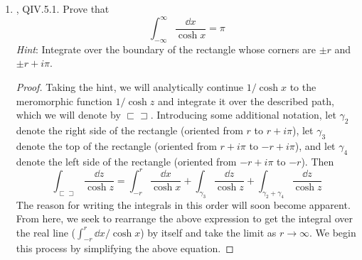 \documentclass[../psets.tex]{subfiles}
\begin{document}
\begin{enumerate}[ref={A.\arabic*}]
\begin{enumerate}
\begin{proof}
            \begin{align*}
                \res_{\bar{z}}f &= \frac{1}{2\pi i}\int_{g(\partial D)}f(w)\dd{w}\\
                &= \frac{1}{2\pi i}\int_{\partial D}f(g(\zeta))\dd{w}\\
                &= \frac{1}{2\pi i}\int_{\partial D}f(\bar{\zeta})\dd\bar{\zeta}\\
                &= \frac{1}{2\pi i}\int_{\partial D}\overline{f(\zeta)\dd\zeta}\\
                &= \frac{1}{2\pi i}\overline{\int_{\partial D}f(\zeta)\dd\zeta}\\
                &= \overline{\frac{1}{2\pi i}\int_{\partial D}f(\zeta)\dd\zeta}\\
                &= \overline{\res_zf}
            \end{align*}
            as desired. Note that from the second to the third line above, we have just renamed $\dd{w}$ to $\dd\bar{z}$; we have not taken a derivative and done an infinitesimal substitution as in parts (a)-(c).
        \end{proof}
    \end{enumerate}
    \item \textcite{bib:FischerLieb}, QIV.5.1. Prove that
    \begin{equation*}
        \int_{-\infty}^\infty\frac{\dd{x}}{\cosh x} = \pi
    \end{equation*}
    \emph{Hint}: Integrate over the boundary of the rectangle whose corners are $\pm r$ and $\pm r+i\pi$.
    \begin{proof}
        Taking the hint, we will analytically continue $1/\cosh x$ to the meromorphic function $1/\cosh z$ and integrate it over the described path, which we will denote by $\sqsubset\!\sqsupset$. Introducing some additional notation, let $\gamma_2$ denote the right side of the rectangle (oriented from $r$ to $r+i\pi$), let $\gamma_3$ denote the top of the rectangle (oriented from $r+i\pi$ to $-r+i\pi$), and let $\gamma_4$ denote the left side of the rectangle (oriented from $-r+i\pi$ to $-r$). Then
        \begin{equation*}
            \int_{\sqsubset\!\sqsupset}\frac{\dd{z}}{\cosh z} = \int_{-r}^r\frac{\dd{x}}{\cosh x}+\int_{\gamma_3}\frac{\dd{z}}{\cosh z}+\int_{\gamma_2+\gamma_4}\frac{\dd{z}}{\cosh z}
        \end{equation*}
        The reason for writing the integrals in this order will soon become apparent. From here, we seek to rearrange the above expression to get the integral over the real line ($\int_{-r}^r\dd{x}/\cosh x$) by itself and take the limit as $r\to\infty$. We begin this process by simplifying the above equation.\par

\end{proof}
\end{enumerate}
\end{document}
